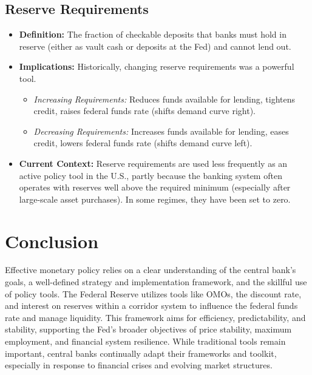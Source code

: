 \subsection{Reserve Requirements}
\begin{itemize}
    \item \textbf{Definition:} The fraction of checkable deposits that banks must hold in reserve (either as vault cash or deposits at the Fed) and cannot lend out.
    \item \textbf{Implications:} Historically, changing reserve requirements was a powerful tool.
        \begin{itemize}
            \item \textit{Increasing Requirements:} Reduces funds available for lending, tightens credit, raises federal funds rate (shifts demand curve right).
            \item \textit{Decreasing Requirements:} Increases funds available for lending, eases credit, lowers federal funds rate (shifts demand curve left).
        \end{itemize}
    \item \textbf{Current Context:} Reserve requirements are used less frequently as an active policy tool in the U.S., partly because the banking system often operates with reserves well above the required minimum (especially after large-scale asset purchases). In some regimes, they have been set to zero.
\end{itemize}

\section{Conclusion}

Effective monetary policy relies on a clear understanding of the central bank's goals, a well-defined strategy and implementation framework, and the skillful use of policy tools. The Federal Reserve utilizes tools like OMOs, the discount rate, and interest on reserves within a corridor system to influence the federal funds rate and manage liquidity. This framework aims for efficiency, predictability, and stability, supporting the Fed's broader objectives of price stability, maximum employment, and financial system resilience. While traditional tools remain important, central banks continually adapt their frameworks and toolkit, especially in response to financial crises and evolving market structures.
